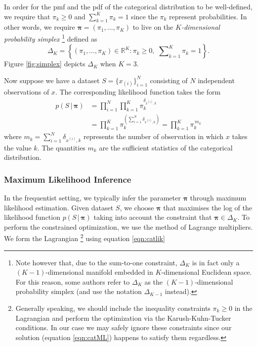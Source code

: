 \documentclass[final,3p,times,twocolumn]{elsarticle}
\let\bs\boldsymbol
\begin{document}
In order for the pmf and the pdf of the categorical distribution to be well-defined, we require that $\pi_k \geq 0$ and $\sum_{k=1}^K \pi_k = 1$ since the $\pi_k$ represent probabilities.
In other words, we require $\bs \pi = (\pi_1,\dots,\pi_K)$ to live on the \emph{$K$-dimensional probability simplex}
\footnote{Note however that, due to the sum-to-one constraint, $\Delta_K$ is in fact only a $(K-1)$-dimensional manifold embedded in $K$-dimensional Euclidean space.
For this reason, some authors refer to $\Delta_K$ as the $(K-1)$-dimensional probability simplex (and use the notation $\Delta_{K-1}$ instead).}
defined as
\begin{equation}
\label{eqn:simplex}
\Delta_K = \left\{(\pi_1,\dots,\pi_K) \in \mathbb{R}^K : \pi_k \geq 0,\,\, \sum \nolimits _{k=1}^K \pi_k = 1\right\}.
\end{equation}
Figure \ref{fig:simplex} depicts $\Delta_K$ when $K=3$.

Now suppose we have a dataset $S=\{x_{(i)}\}_{i=1}^N$ consisting of $N$ independent observations of $x$.
The corresponding likelihood function takes the form
\begin{equation}
\label{eqn:catlik}
\begin{split}
p(S\,|\,\bs \pi) &= \prod_{i=1}^N \prod_{k=1}^K \pi_k^{\delta_{x^{(i)},k}} \\ &= \prod_{k=1}^K \pi_k^{\left(\sum_{i=1}^N \delta_{x^{(i)},k}\right)} = \prod_{k=1}^K \pi_k^{\,m_k}
\end{split}
\end{equation}
where $m_k = \sum_{i=1}^N \delta_{x^{(i)}, k}$ represents the number of observation in which $x$ takes the value $k$.
The quantities $m_k$ are the sufficient statistics of the categorical distribution.

\subsubsection*{\normalfont \small \bfseries Maximum Likelihood Inference}
In the frequentist setting, we typically infer the parameter $\bs \pi$ through maximum likelihood estimation.
Given dataset $S$, we choose $\bs \pi$ that maximises the log of the likelihood function $p(S\,|\,\bs \pi)$ taking into account the constraint that $\bs \pi \in \Delta_K$.
To perform the constrained optimization, we use the method of Lagrange multipliers. We form the Lagrangian
\footnote{Generally speaking, we should include the inequality constraints $\pi_k \geq 0$ in the Lagrangian and perform the optimization via the Karush-Kuhn-Tucker conditions.
In our case we may safely ignore these constraints since our solution (equation \ref{eqn:catML}) happens to satisfy them regardless.}
using equation \ref{eqn:catlik}
\end{document}
